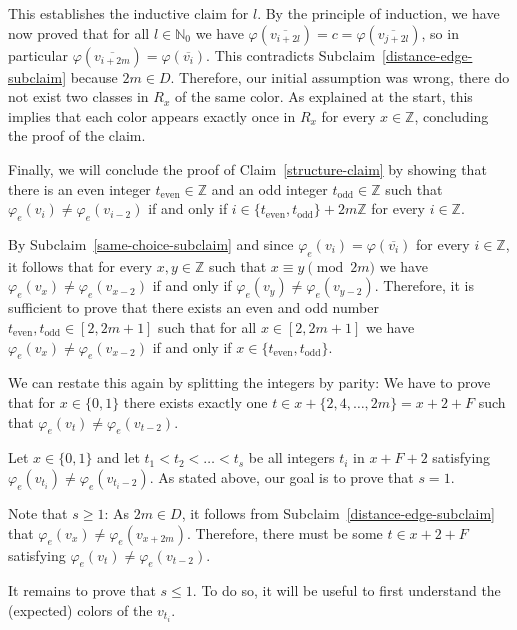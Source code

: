 \documentclass[a4paper,10pt,hidelinks]{amsart}
\renewcommand{\phi}{\ensuremath{\varphi}}
\newenvironment{claimproof}[1][\proofname]{\proof[#1]\renewcommand{\qedsymbol}{$\blacksquare$}}{\endproof}
\newenvironment{subclaimproof}[1][\proofname]{\proof[#1]\renewcommand{\qedsymbol}{$\blacklozenge$}}{\endproof}
\theoremstyle{definition}
\begin{document}
\begin{claimproof}[Proof of Claim~\ref{structure-claim} when $k \in \{6,8\}$]
\begin{subclaimproof}
            This establishes the inductive claim for $l$. By the principle of induction, we have now proved that for all $l \in \mathbb{N}_0$ we have $\varphi(\overline{v_{i + 2l}}) = c = \varphi(\overline{v_{j + 2l}})$, so in particular $\varphi(\overline{v_{i + 2m}}) = \varphi(\overline{v_{i}})$. This contradicts Subclaim~\ref{distance-edge-subclaim} because $2m \in D$. Therefore, our initial assumption was wrong, there do not exist two classes in $R_x$ of the same color. As explained at the start, this implies that each color appears exactly once in $R_x$ for every $x \in \mathbb{Z}$, concluding the proof of the claim.
        \end{subclaimproof}

        Finally, we will conclude the proof of Claim~\ref{structure-claim} by showing that there is an even integer $t_{\text{even}} \in \mathbb{Z}$ and an odd integer $t_{\text{odd}} \in \mathbb{Z}$ such that $\varphi_e(v_i) \neq \varphi_e(v_{i - 2})$ if and only if $i \in \{t_{\text{even}}, t_{\text{odd}}\} + 2m\mathbb{Z}$ for every $i\in \mathbb{Z}$. 

        By Subclaim~\ref{same-choice-subclaim} and since $\phi_e(v_i)=\phi(\overline{v_i})$ for every $i\in \mathbb{Z}$, it follows that for every $x,y \in \mathbb{Z}$ such that $x \equiv y \pmod{2m}$ we have $\varphi_e(v_{x}) \neq \varphi_e(v_{x -2})$ if and only if $\varphi_e(v_{y}) \neq \varphi_e(v_{y-2})$. Therefore, it is sufficient to prove that there exists an even and odd number $t_{\text{even}},t_{\text{odd}}\in [2,2m+1]$ such that for all $x \in [2, 2m+1]$ we have $\varphi_e(v_x) \neq \varphi_e(v_{x - 2})$ if and only if $x \in \{t_{\text{even}}, t_{\text{odd}}\}$.

        We can restate this again by splitting the integers by parity: We have to prove that for $x \in \{0, 1\}$ there exists exactly one $t \in x + \{2, 4, \dots, 2m\} = x + 2 + F$ such that $\varphi_e(v_t) \neq \varphi_e(v_{t-2})$.

        Let $x \in \{0, 1\}$ and let $t_1 < t_2 < \dots < t_s$ be all integers $t_i$ in $x + F+2$ satisfying $\varphi_e(v_{t_i}) \neq \varphi_e(v_{t_i-2})$. As stated above, our goal is to prove that $s = 1$. 

        Note that $s \geq 1$: As $2m \in D$, it follows from Subclaim~\ref{distance-edge-subclaim} that $\varphi_e(v_x) \neq \varphi_e(v_{x + 2m})$. Therefore, there must be some $t \in x + 2 + F$ satisfying $\varphi_e(v_t) \neq \varphi_e(v_{t - 2})$.

        It remains to prove that $s \leq 1$. 
        To do so, it will be useful to first understand the (expected) colors of the $v_{t_i}$. 


\end{claimproof}
\end{document}
